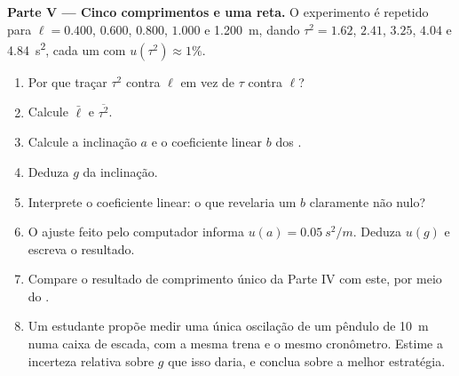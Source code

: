 \begin{problem}
\medskip
\noindent\textbf{Parte V --- Cinco comprimentos e uma reta.}
O experimento é repetido para $\ell = 0.400$, $0.600$, $0.800$,
$1.000$ e \qty{1.200}{m}, dando $\tau^2 = 1.62$, $2.41$, $3.25$,
$4.04$ e \qty{4.84}{s^2}, cada um com $u(\tau^2) \approx 1\%$.
\begin{enumerate}[resume]
  \item Por que traçar $\tau^2$ contra $\ell$ em vez de $\tau$ contra
        $\ell$?
  \item Calcule $\bar\ell$ e $\overline{\tau^2}$.
  \item Calcule a inclinação $a$ e o coeficiente linear $b$ dos .
  \item Deduza $g$ da inclinação.
  \item Interprete o coeficiente linear: o que revelaria um $b$ claramente
        não nulo?
  \item O ajuste feito pelo computador informa $u(a) = \qty{0.05}{s^2/m}$. Deduza
        $u(g)$ e escreva o resultado.
  \item Compare o resultado de comprimento único da Parte IV com este, por
        meio do .
  \item Um estudante propõe medir uma única oscilação de um pêndulo de
        \qty{10}{m} numa caixa de escada, com a mesma trena e o mesmo
        cronômetro. Estime a incerteza relativa sobre $g$ que isso daria,
        e conclua sobre a melhor estratégia.
\end{enumerate}
\end{problem}
